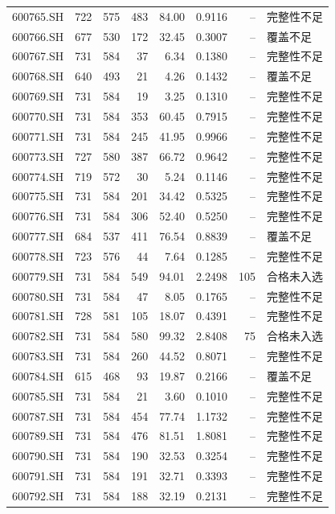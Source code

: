 \documentclass[10pt,a4paper]{article}
\begin{document}
\begin{longtable}{lrrr r r r l}
600765.SH & 722 & 575 & 483 & 84.00 & 0.9116 & -- & 完整性不足\\
600766.SH & 677 & 530 & 172 & 32.45 & 0.3007 & -- & 覆盖不足\\
600767.SH & 731 & 584 & 37 & 6.34 & 0.1380 & -- & 完整性不足\\
600768.SH & 640 & 493 & 21 & 4.26 & 0.1432 & -- & 覆盖不足\\
600769.SH & 731 & 584 & 19 & 3.25 & 0.1310 & -- & 完整性不足\\
600770.SH & 731 & 584 & 353 & 60.45 & 0.7915 & -- & 完整性不足\\
600771.SH & 731 & 584 & 245 & 41.95 & 0.9966 & -- & 完整性不足\\
600773.SH & 727 & 580 & 387 & 66.72 & 0.9642 & -- & 完整性不足\\
600774.SH & 719 & 572 & 30 & 5.24 & 0.1146 & -- & 完整性不足\\
600775.SH & 731 & 584 & 201 & 34.42 & 0.5325 & -- & 完整性不足\\
600776.SH & 731 & 584 & 306 & 52.40 & 0.5250 & -- & 完整性不足\\
600777.SH & 684 & 537 & 411 & 76.54 & 0.8839 & -- & 覆盖不足\\
600778.SH & 723 & 576 & 44 & 7.64 & 0.1285 & -- & 完整性不足\\
600779.SH & 731 & 584 & 549 & 94.01 & 2.2498 & 105 & 合格未入选\\
600780.SH & 731 & 584 & 47 & 8.05 & 0.1765 & -- & 完整性不足\\
600781.SH & 728 & 581 & 105 & 18.07 & 0.4391 & -- & 完整性不足\\
600782.SH & 731 & 584 & 580 & 99.32 & 2.8408 & 75 & 合格未入选\\
600783.SH & 731 & 584 & 260 & 44.52 & 0.8071 & -- & 完整性不足\\
600784.SH & 615 & 468 & 93 & 19.87 & 0.2166 & -- & 覆盖不足\\
600785.SH & 731 & 584 & 21 & 3.60 & 0.1010 & -- & 完整性不足\\
600787.SH & 731 & 584 & 454 & 77.74 & 1.1732 & -- & 完整性不足\\
600789.SH & 731 & 584 & 476 & 81.51 & 1.8081 & -- & 完整性不足\\
600790.SH & 731 & 584 & 190 & 32.53 & 0.3254 & -- & 完整性不足\\
600791.SH & 731 & 584 & 191 & 32.71 & 0.3393 & -- & 完整性不足\\
600792.SH & 731 & 584 & 188 & 32.19 & 0.2131 & -- & 完整性不足\\

\end{longtable}
\end{document}
